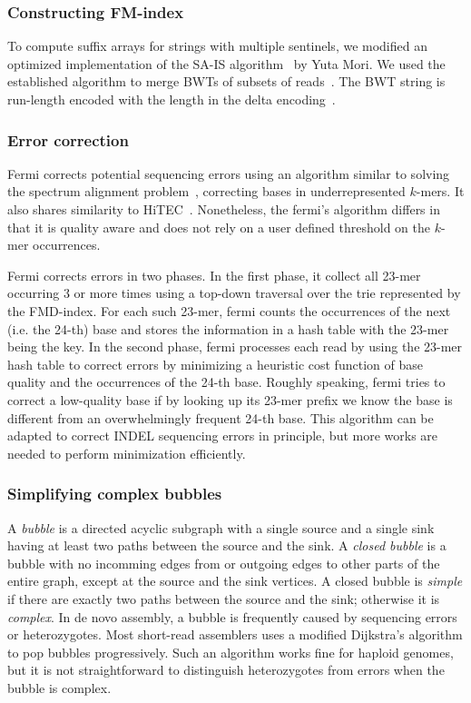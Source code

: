 \documentclass{bioinfo}
\begin{document}
\begin{methods}
\subsubsection{Constructing FM-index}
To compute suffix arrays for strings with multiple sentinels, we modified an
optimized implementation of the SA-IS algorithm~\citep{DBLP:journals/tc/NongZC11} by Yuta
Mori.  We used the established algorithm to merge BWTs of subsets of
reads~\citep{DBLP:journals/algorithmica/HonLSSY07,en:2009fk,DBLP:conf/latin/FerraginaGM10}.
The BWT string is run-length encoded with the length in the delta
encoding~\citep{Elias:1975ly}.

\subsubsection{Error correction}
Fermi corrects potential sequencing errors using an algorithm similar to
solving the spectrum alignment problem~\citep{Pevzner:2001vn}, correcting
bases in underrepresented $k$-mers. It also shares similarity to
HiTEC~\citep{Ilie:2011fk}. Nonetheless, the fermi's algorithm differs in that
it is quality aware and does not rely on a user defined threshold on the
$k$-mer occurrences.

Fermi corrects errors in two phases. In the first phase, it collect all 23-mer
occurring 3 or more times using a top-down traversal over the trie represented
by the FMD-index. For each such 23-mer, fermi counts the occurrences of
the next (i.e. the 24-th) base and stores the information in a hash table
with the 23-mer being the key. In the second phase, fermi processes each read
by using the 23-mer hash table to correct errors by minimizing a heuristic cost
function of base quality and the occurrences of the 24-th base. Roughly
speaking, fermi tries to correct a low-quality base if by looking up its 23-mer
prefix we know the base is different from an overwhelmingly frequent 24-th base.
This algorithm can be adapted to correct INDEL sequencing errors in principle,
but more works are needed to perform minimization efficiently.

\subsubsection{Simplifying complex bubbles}
A \emph{bubble} is a directed acyclic subgraph with a single source and a
single sink having at least two paths between the source and the sink. A
\emph{closed bubble} is a bubble with no incomming edges from or outgoing edges
to other parts of the entire graph, except at the source and the sink vertices.
A closed bubble is \emph{simple} if there are exactly two paths between the
source and the sink; otherwise it is \emph{complex}.  In de novo assembly, a
bubble is frequently caused by sequencing errors or heterozygotes. Most
short-read assemblers uses a modified Dijkstra's algorithm to pop bubbles
progressively. Such an algorithm works fine for haploid genomes, but it is not
straightforward to distinguish heterozygotes from errors when the bubble is
complex.


\end{methods}
\end{document}
